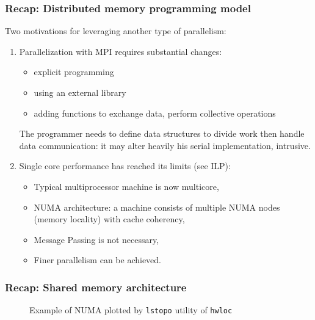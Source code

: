 \begin{frame}
\frametitle{Recap: Distributed memory programming model}

Two motivations for leveraging another type of parallelism:\\[2ex]
\begin{enumerate}
\item Parallelization with MPI requires substantial changes:
\begin{itemize}
\item explicit programming
\item using an external library
\item adding functions to exchange data, perform collective operations
\end{itemize}

The programmer needs to define data structures to divide work then handle data communication: it may alter heavily his serial implementation, intrusive.
\bigskip
\item Single core performance has reached its limits (see ILP):
\begin{itemize}
\item Typical multiprocessor machine is now multicore,
\item NUMA architecture: a machine consists of multiple NUMA nodes (memory locality) with cache coherency,
\item Message Passing is not necessary,
\item Finer parallelism can be achieved. 
\end{itemize}

\end{enumerate}

\end{frame}

\begin{frame}
\frametitle{Recap: Shared memory architecture}


\begin{figure}[h]
\caption{Example of NUMA plotted by \texttt{lstopo} utility of \texttt{hwloc}}
\end{figure}

\end{frame}

